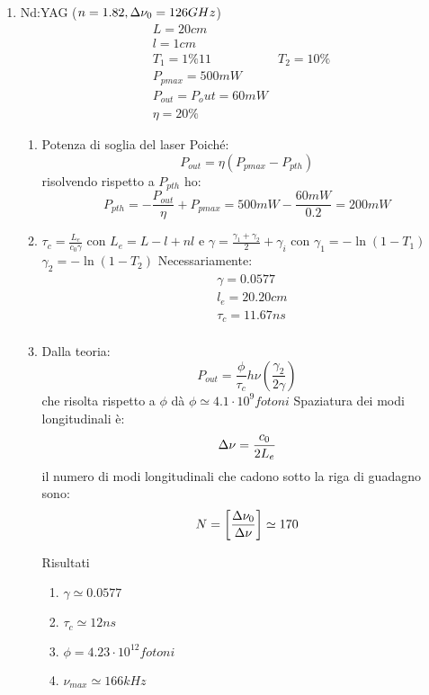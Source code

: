 \begin{enumerate}
\item Nd:YAG ($n = 1.82, \Delta \nu_0 = 126 GHz$)
\begin{align*}
&L = 20 cm\\
&l = 1cm\\
&T_1 = 1\%11
&T_2 = 10\%\\
&P_{p max} = 500 mW\\
&P_{out} = P_out = 60 mW\\
&\eta = 20\%
\end{align*}
\begin{enumerate}
\item Potenza di soglia del laser
Poiché:
\begin{equation*}
P_{out} = \eta (P_{p max} - P_{p th})
\end{equation*}
risolvendo rispetto a $P_{p th}$ ho:
\begin{equation*}
P_{p th} = -\frac{P_{out}}{\eta} + P_{p max} = 500 mW - \frac{60 mW}{0.2} = 200 mW
\end{equation*}
\item $\tau_c = \frac{L_e}{c_0 \gamma}$ con $L_e = L - l + nl$ e $\gamma = \frac{\gamma_1 + \gamma_2}{2} + \gamma_i$ con $\gamma_1 = - \ln (1-T_1)$ $\gamma_2 = - \ln(1-T_2)$
Necessariamente:
\begin{align*}
&\gamma = 0.0577\\
&l_e = 20.20 cm\\
&\tau_c = 11.67 ns\\
\end{align*}

\item Dalla teoria:
\begin{equation*}
P_{out} = \frac{\phi}{\tau_c} h\nu \left(\frac{\gamma_2}{2\gamma}\right)
\end{equation*}
che risolta rispetto a $\phi$ dà $\phi \simeq 4.1 \cdot 10^9 fotoni$
Spaziatura dei modi longitudinali è:
\begin{equation*}
\Delta\nu = \frac{c_0}{2L_e}
\end{equation*}
il numero di modi longitudinali che cadono sotto la riga di guadagno sono:
\begin{equation*}
N = \left[\frac{\Delta\nu_0}{\Delta \nu}\right] \simeq 170
\end{equation*}

\item [Risultati]
\begin{enumerate}
\item $\gamma \simeq 0.0577$
\item $\tau_c \simeq 12 ns$
\item $\phi = 4.23 \cdot 10^{12} fotoni$
\item $\nu_{max} \simeq 166 kHz$
\end{enumerate}
\end{enumerate}
\end{enumerate}